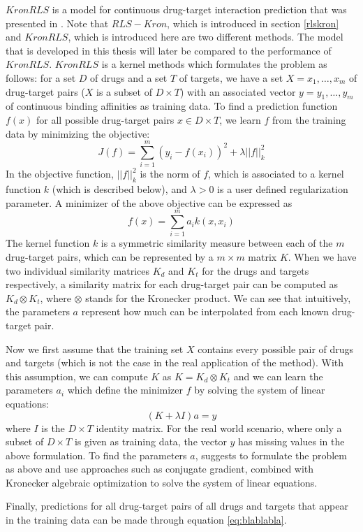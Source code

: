 $KronRLS$ is a model for continuous drug-target interaction prediction that was presented in \cite{pahikkala2014toward}. Note that $RLS-Kron$, which is introduced in section \ref{rlskron} and $KronRLS$, which is introduced here are two different methods. The model that is developed in this thesis will later be compared to the performance of $KronRLS$. $KronRLS$ is a kernel methods which formulates the problem as follows:
for a set $D$ of drugs and a set $T$ of targets, we have a set $X = x_1,\dots,x_m$ of drug-target pairs ($X$ is a subset of $D\times T$) with an associated vector $y = y_1,\dots,y_m$ of continuous binding affinities as training data. To find a prediction function $f(x)$ for all possible drug-target pairs $x \in D\times T$, we learn $f$ from the training data by minimizing the objective:
\begin{equation}
J(f) = \sum\limits_{i=1}^{m}(y_i-f(x_i))^2 + \lambda ||f||_k^2
\end{equation}
In the objective function, $||f||_k^2$ is the norm of $f$, which is associated to a kernel function $k$ (which is described below), and $\lambda>0$ is a user defined regularization parameter. A minimizer of the above objective can be expressed as 
\begin{equation}
\label{eq:blablabla}
f(x)=\sum\limits_{i=1}^
{m} a_i k(x,x_i)
\end{equation}
The kernel function $k$ is a symmetric similarity measure between each of the $m$ drug-target pairs, which can be represented by a $m \times m$ matrix $K$. When we have two individual similarity matrices $K_d$ and $K_t$ for the drugs and targets respectively, a similarity matrix for each drug-target pair can be computed as \mbox{$K_d \otimes K_t$}, where $\otimes$ stands for the Kronecker product. We can see that intuitively, the parameters $a$ represent how much can be interpolated from each known drug-target pair.

Now we first assume that the training set $X$ contains every possible pair of drugs and targets (which is not the case in the real application of the method). With this assumption, we can compute $K$ as \mbox{$K = K_d \otimes K_t$} and we can learn the parameters $a_i$ which define the minimizer $f$ by solving the system of linear equations:
\begin{equation}
(K+\lambda I)a = y
\end{equation} where $I$ is the $D\times T$ identity matrix. 
For the real world scenario, where only a subset of $D\times T$ is given as training data, the vector $y$ has missing values in the above formulation. To find the parameters $a$,  \cite{pahikkala2014toward} suggests to formulate the problem as above and use approaches such as conjugate gradient, combined with Kronecker algebraic optimization to solve the system of linear equations.

Finally, predictions for all drug-target pairs of all drugs and targets that appear in the training data can be made through equation \ref{eq:blablabla}.



